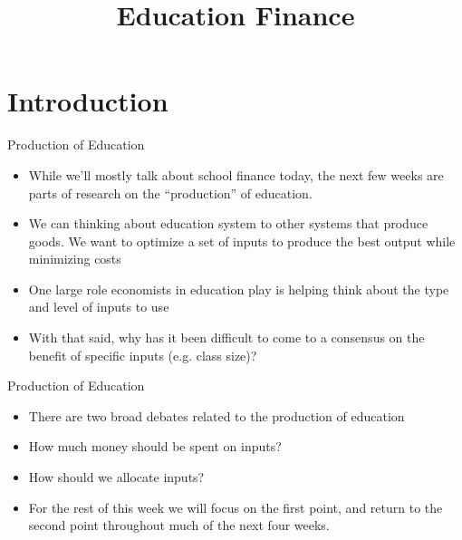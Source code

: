 \documentclass{beamer}
\title{Education Finance}
\begin{document}
\maketitle

\section{Introduction}

\begin{frame}[<+->]{Production of Education}
	\begin{itemize}
		\item While we'll mostly talk about school finance today, the next few weeks are parts of research on the ``production'' of education. 
		\item We can thinking about education system to other systems that produce goods. We want to optimize a set of inputs to produce the best output while minimizing costs 
		\item One large role economists in education play is helping think about the type and level of inputs to use 
		\item With that said, why has it been difficult to come to a consensus on the benefit of specific inputs (e.g. class size)?
	\end{itemize}
\end{frame}

\begin{frame}[<+->]{Production of Education}
	\begin{itemize}
		\item There are two broad debates related to the production of education
		\item How much money should be spent on inputs?
		\item How should we allocate inputs?
		\item For the rest of this week we will focus on the first point, and return to the second point throughout much of the next four weeks.
	\end{itemize}
\end{frame}
\end{document}

